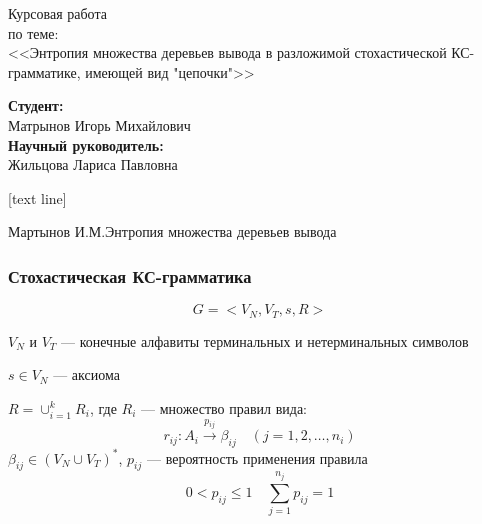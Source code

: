 \documentclass{beamer}
\renewcommand{\leq}{\leqslant}
\begin{document}
	
	\begin{frame}
		\begin{center}
			{\Large Курсовая работа} \\
			{\small по теме:} \\
			\vspace{5mm}
			{\LARGE <<Энтропия множества деревьев вывода в разложимой стохастической КС-грамматике, имеющей вид "цепочки"{}>> }
		\end{center}
		
		\vfill
		
		{\small
		\begin{flushright}
			\textbf{Студент:} \\
			Матрынов Игорь Михайлович\\
			\vspace{5mm}
			\textbf{Научный руководитель:} \\
			Жильцова Лариса Павловна \\
		\end{flushright}
		}
	\end{frame}
	
	[text line]
	{
		\parbox{\linewidth}{\vspace*{-8pt} \color{gray} Мартынов И.М.\hfill Энтропия множества деревьев вывода \hfill\insertpagenumber}
	}

	\begin{frame}
		\frametitle{Стохастическая КС-грамматика}
		{\Large
		\begin{equation*}
			G = <V_N, V_T, s, R>
		\end{equation*}
		}
		\vspace{5pt}
		
		$V_N$ и $V_T$ --- конечные алфавиты терминальных и нетерминальных символов
		\vspace{2pt}
		
		$s \in V_N$ --- аксиома
		\vspace{2pt}
		
		$R = \cup_{i=1}^k R_i$, где $R_i$ --- множество правил вида:
		\begin{equation*}
			r_{ij} : A_i \xrightarrow{p_{ij}} \beta_{ij}\quad (j = 1,2,\ldots,n_i)
		\end{equation*}
		$\beta_{ij} \in (V_N \cup V_T)^*$, $p_{ij}$ --- вероятность применения правила
		\begin{equation*}
			0 < p_{ij} \leq 1\quad \sum_{j=1}^{n_j} p_{ij} = 1
		\end{equation*}
	\end{frame}
	
\end{document}
